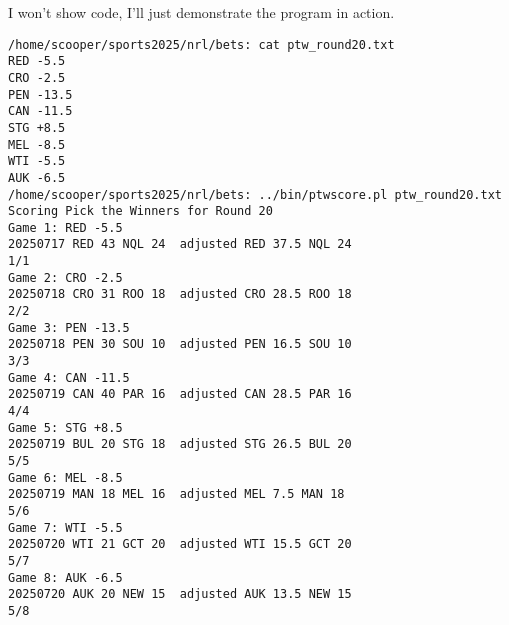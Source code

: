 \documentclass{article}
\begin{document}
I won't show code, I'll just demonstrate the program in action.

\begin{verbatim}
/home/scooper/sports2025/nrl/bets: cat ptw_round20.txt
RED -5.5
CRO -2.5
PEN -13.5
CAN -11.5
STG +8.5
MEL -8.5
WTI -5.5
AUK -6.5
/home/scooper/sports2025/nrl/bets: ../bin/ptwscore.pl ptw_round20.txt
Scoring Pick the Winners for Round 20
Game 1: RED -5.5
20250717 RED 43 NQL 24  adjusted RED 37.5 NQL 24
1/1
Game 2: CRO -2.5
20250718 CRO 31 ROO 18  adjusted CRO 28.5 ROO 18
2/2
Game 3: PEN -13.5
20250718 PEN 30 SOU 10  adjusted PEN 16.5 SOU 10
3/3
Game 4: CAN -11.5
20250719 CAN 40 PAR 16  adjusted CAN 28.5 PAR 16
4/4
Game 5: STG +8.5
20250719 BUL 20 STG 18  adjusted STG 26.5 BUL 20
5/5
Game 6: MEL -8.5
20250719 MAN 18 MEL 16  adjusted MEL 7.5 MAN 18
5/6
Game 7: WTI -5.5
20250720 WTI 21 GCT 20  adjusted WTI 15.5 GCT 20
5/7
Game 8: AUK -6.5
20250720 AUK 20 NEW 15  adjusted AUK 13.5 NEW 15
5/8
\end{verbatim}
\end{document}
